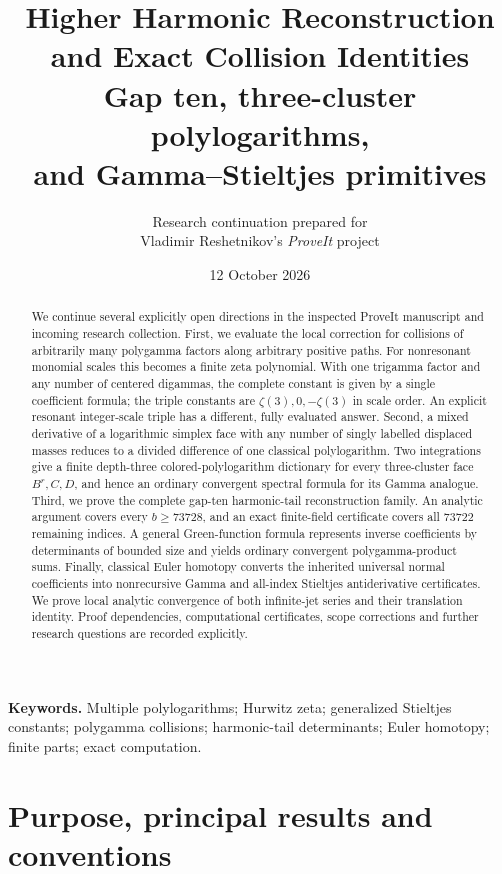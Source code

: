 \documentclass[11pt,a4paper]{article}
\title{\textbf{Higher Harmonic Reconstruction\\and Exact Collision Identities}\\[5pt]
  \large Gap ten, three-cluster polylogarithms,\\and Gamma--Stieltjes primitives}
\author{Research continuation prepared for\\Vladimir Reshetnikov's \emph{ProveIt} project}
\date{12 October 2026}
\theoremstyle{definition}
\theoremstyle{remark}
\numberwithin{equation}{section}
\begin{document}
\maketitle
\begin{abstract}
We continue several explicitly open directions in the inspected ProveIt
manuscript and incoming research collection. First, we evaluate the local
correction for collisions of arbitrarily many polygamma factors along
arbitrary positive paths. For nonresonant monomial scales this becomes a
finite zeta polynomial. With one trigamma factor and any number of centered
digammas, the complete constant is given by a single coefficient formula;
the triple constants are $\zeta(3),0,-\zeta(3)$ in scale order. An explicit
resonant integer-scale triple has a different, fully evaluated answer.
Second, a mixed derivative of a logarithmic simplex face with any number
of singly labelled displaced masses reduces to a divided difference of
one classical polylogarithm. Two integrations give a finite depth-three
colored-polylogarithm dictionary for every three-cluster face $B^r,C,D$,
and hence an ordinary convergent spectral formula for its Gamma analogue.
Third, we prove the complete gap-ten harmonic-tail reconstruction family.
An analytic argument covers every $b\ge73728$, and an exact finite-field
certificate covers all $73722$ remaining indices. A general Green-function
formula represents inverse coefficients by determinants of bounded size
and yields ordinary convergent polygamma-product sums. Finally, classical
Euler homotopy converts the inherited universal normal coefficients into
nonrecursive Gamma and all-index Stieltjes antiderivative certificates.
We prove local analytic convergence of both infinite-jet series and their
translation identity. Proof dependencies, computational certificates,
scope corrections and further research questions are recorded explicitly.
\end{abstract}
\noindent\textbf{Keywords.} Multiple polylogarithms; Hurwitz zeta;
generalized Stieltjes constants; polygamma collisions; harmonic-tail
determinants; Euler homotopy; finite parts; exact computation.

\clearpage
{\setlength{\parskip}{0pt}\small\tableofcontents}
\clearpage

\section{Purpose, principal results and conventions}
\label{intro:section}
\end{document}
